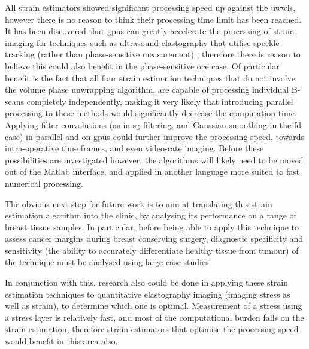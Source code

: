 All strain estimators showed significant processing speed up against the \ac{uwwls}, however there is no reason to think their processing time limit has been reached. It has been discovered that \ac{gpu}s can greatly accelerate the processing of strain imaging for techniques such as ultrasound elastography that utilise speckle-tracking (rather than phase-sensitive measurement) \cite{peng_gpu-accelerated_2017}, therefore there is reason to believe this could also benefit in the phase-sensitive \ac{oce} case. Of particular benefit is the fact that all four strain estimation techniques that do not involve the volume phase unwrapping algorithm, are capable of processing individual B-scans completely independently, making it very likely that introducing parallel processing to these methods would significantly decrease the computation time. Applying filter convolutions (as in \ac{sg} filtering, and Gaussian smoothing in the \ac{fd} case) in parallel and on \ac{gpu}s could further improve the processing speed, towards intra-operative time frames, and even video-rate imaging. Before these possibilities are investigated however, the algorithms will likely need to be moved out of the Matlab interface, and applied in another language more suited to fast numerical processing.

The obvious next step for future work is to aim at translating this strain estimation algorithm into the clinic, by analysing its performance on a range of breast tissue samples. In particular, before being able to apply this technique to assess cancer margins during breast conserving surgery, diagnostic specificity and sensitivity (the ability to accurately differentiate healthy tissue from tumour) of the technique must be analysed using large case studies.

In conjunction with this, research also could be done in applying these strain estimation techniques to quantitative elastography imaging (imaging stress as well as strain), to determine which one is optimal. Measurement of a stress using a stress layer is relatively fast, and most of the computational burden falls on the strain estimation, therefore strain estimators that optimise the processing speed would benefit in this area also. 

